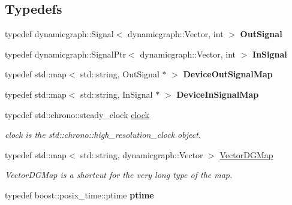 \subsection*{Typedefs}
\begin{DoxyCompactItemize}
\item 
typedef dynamicgraph\+::\+Signal$<$ dynamicgraph\+::\+Vector, int $>$ {\bfseries Out\+Signal}\hypertarget{namespacedynamic__graph_a6c34573645d04590fd934e56f3d1b16b}{}\label{namespacedynamic__graph_a6c34573645d04590fd934e56f3d1b16b}

\item 
typedef dynamicgraph\+::\+Signal\+Ptr$<$ dynamicgraph\+::\+Vector, int $>$ {\bfseries In\+Signal}\hypertarget{namespacedynamic__graph_a5a0e93b7f753ed4c9869e83a04c30d74}{}\label{namespacedynamic__graph_a5a0e93b7f753ed4c9869e83a04c30d74}

\item 
typedef std\+::map$<$ std\+::string, Out\+Signal $\ast$ $>$ {\bfseries Device\+Out\+Signal\+Map}\hypertarget{namespacedynamic__graph_a4769898c82f6e8bef38422819cca0481}{}\label{namespacedynamic__graph_a4769898c82f6e8bef38422819cca0481}

\item 
typedef std\+::map$<$ std\+::string, In\+Signal $\ast$ $>$ {\bfseries Device\+In\+Signal\+Map}\hypertarget{namespacedynamic__graph_a7deb814159c6992434f2660870726c73}{}\label{namespacedynamic__graph_a7deb814159c6992434f2660870726c73}

\item 
typedef std\+::chrono\+::steady\+\_\+clock \hyperlink{namespacedynamic__graph_aca70acb5331a18e090e49b3d85290a7e}{clock}
\begin{DoxyCompactList}\small\item\em clock is the std\+::chrono\+::high\+\_\+resolution\+\_\+clock object. \end{DoxyCompactList}\item 
typedef std\+::map$<$ std\+::string, dynamicgraph\+::\+Vector $>$ \hyperlink{namespacedynamic__graph_a51212ed7fa4ae81e7b362a27f09b7ab8}{Vector\+D\+G\+Map}\hypertarget{namespacedynamic__graph_a51212ed7fa4ae81e7b362a27f09b7ab8}{}\label{namespacedynamic__graph_a51212ed7fa4ae81e7b362a27f09b7ab8}

\begin{DoxyCompactList}\small\item\em Vector\+D\+G\+Map is a shortcut for the very long type of the map. \end{DoxyCompactList}\item 
typedef boost\+::posix\+\_\+time\+::ptime {\bfseries ptime}\hypertarget{namespacedynamic__graph_a51b66113dc1d4eee03abd7779479cc69}{}\label{namespacedynamic__graph_a51b66113dc1d4eee03abd7779479cc69}


\end{DoxyCompactItemize}
